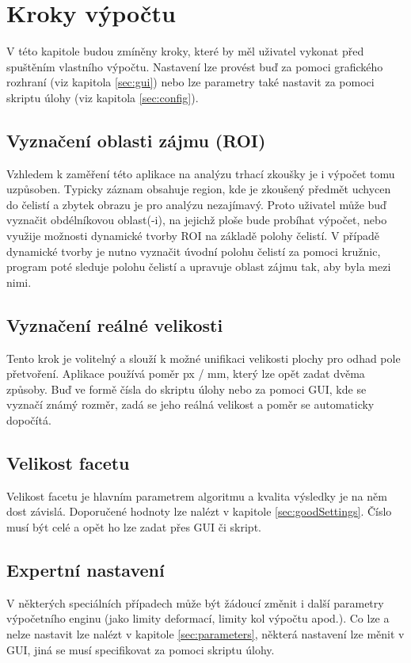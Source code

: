 \documentclass[a4paper,12pt]{article}
\begin{document}
\section{Kroky výpočtu}
V této kapitole budou zmíněny kroky, které by měl uživatel vykonat před spuštěním vlastního výpočtu. Nastavení lze provést buď za pomoci grafického rozhraní (viz kapitola \ref{sec:gui}) nebo lze parametry také nastavit za pomoci skriptu úlohy (viz kapitola \ref{sec:config}).
\subsection{Vyznačení oblasti zájmu (ROI)}
Vzhledem k zaměření této aplikace na analýzu trhací zkoušky je i výpočet tomu uzpůsoben. Typicky záznam obsahuje region, kde je zkoušený předmět uchycen do čelistí a zbytek obrazu je pro analýzu nezajímavý. Proto uživatel může buď vyznačit obdélníkovou oblast(-i), na jejichž ploše bude probíhat výpočet, nebo využije možnosti dynamické tvorby ROI na základě polohy čelistí. V případě dynamické tvorby je nutno vyznačit úvodní polohu čelistí za pomoci kružnic, program poté sleduje polohu čelistí a upravuje oblast zájmu tak, aby byla mezi nimi.
\subsection{Vyznačení reálné velikosti}
Tento krok je volitelný a slouží k možné unifikaci velikosti plochy pro odhad pole přetvoření. Aplikace používá poměr px / mm, který lze opět zadat dvěma způsoby. Buď ve formě čísla do skriptu úlohy nebo za pomoci GUI, kde se vyznačí známý rozměr, zadá se jeho reálná velikost a poměr se automaticky dopočítá.
\subsection{Velikost facetu}
Velikost facetu je hlavním parametrem algoritmu a kvalita výsledky je na něm dost závislá. Doporučené hodnoty lze nalézt v kapitole \ref{sec:goodSettings}. Číslo musí být celé a opět ho lze zadat přes GUI či skript.
\subsection{Expertní nastavení}
V některých speciálních případech může být žádoucí změnit i další parametry výpočetního enginu (jako limity deformací, limity kol výpočtu apod.). Co lze a nelze nastavit lze nalézt v kapitole \ref{sec:parameters}, některá nastavení lze měnit v GUI, jiná se musí specifikovat za pomoci skriptu úlohy.
\newpage
\end{document}
